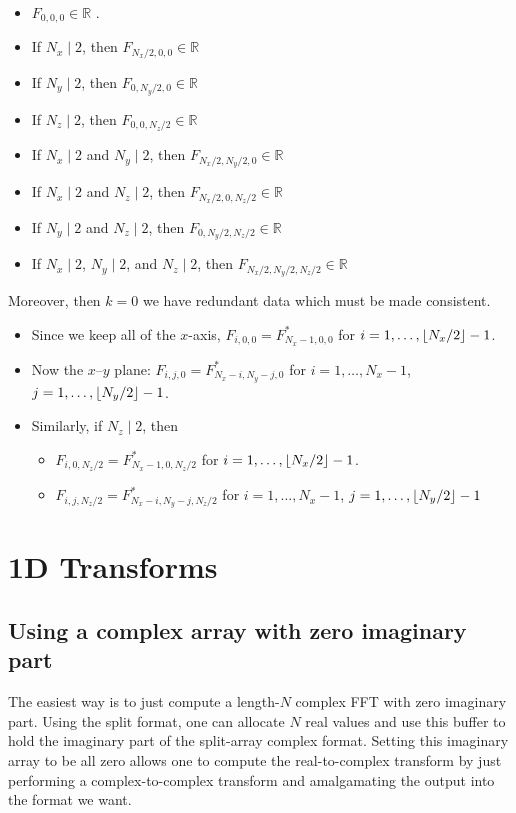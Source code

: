\documentclass[12pt]{article}
\DeclarePairedDelimiter\floor{\lfloor}{\rfloor}
\renewcommand{\(}{\left(}
\renewcommand{\)}{\right)}
\begin{document}
\begin{itemize}
\item $F_{0,0,0} \in \mathbb{R}$ .
\item If $N_x \mid 2$, then $F_{N_x/2,0,0} \in \mathbb{R}$
\item If $N_y \mid 2$, then $F_{0,N_y/2,0} \in \mathbb{R}$
\item If $N_z \mid 2$, then $F_{0,0,N_z/2} \in \mathbb{R}$
\item If $N_x \mid 2$ and $N_y \mid 2$, then $F_{N_x/2,N_y/2,0} \in \mathbb{R}$
\item If $N_x \mid 2$ and $N_z \mid 2$, then $F_{N_x/2,0,N_z/2} \in \mathbb{R}$
\item If $N_y \mid 2$ and $N_z \mid 2$, then $F_{0,N_y/2,N_z/2} \in \mathbb{R}$
\item If $N_x \mid 2$, $N_y \mid 2$, and $N_z \mid 2$, then
  $F_{N_x/2,N_y/2,N_z/2} \in \mathbb{R}$
\end{itemize}
Moreover, then $k=0$ we have redundant data which must be made
consistent.
\begin{itemize}
\item Since we keep all of the $x$-axis, $F_{i,0,0}=F^*_{N_x-1,0,0}$ for
  $i=1,\dots,\floor{N_x/2}-1$.
\item Now the $x$--$y$ plane: $F_{i,j,0}=F^*_{N_x-i,N_y-j,0}$ for
  $i=1,\dots,N_x-1$, $j=1,\dots,\floor{N_y/2}-1$.
\item Similarly, if $N_z\mid{}2$, then
  \begin{itemize}
  \item $F_{i,0,N_z/2}=F^*_{N_x-1,0,N_z/2}$ for $i=1,\dots,\floor{N_x/2}-1$.
  \item $F_{i,j,N_z/2}=F^*_{N_x-i,N_y-j,N_z/2}$ for $i=1,\dots,N_x-1$,
    $j=1,\dots,\floor{N_y/2}-1$
  \end{itemize}
\end{itemize}


\section{1D Transforms}

\subsection{Using a complex array with zero imaginary part}
\label{embed1d}
The easiest way is to just compute a length-$N$ complex FFT with zero
imaginary part.  Using the split format, one can allocate $N$ real
values and use this buffer to hold the imaginary part of the
split-array complex format.  Setting this imaginary array to be all
zero allows one to compute the real-to-complex transform by just
performing a complex-to-complex transform and amalgamating the output
into the format we want.
\end{document}
